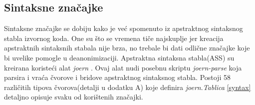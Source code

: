 \subsection{Sintaksne značajke}
Sintaksne značajke se dobiju kako je već spomenuto iz apstraktnog sintaksnog stabla izvornog koda. One su što se vremena tiče najskuplje jer kreacija apstraktnih sintaksnih stabala nije brza, no trebale bi dati odlične značajke koje bi uvelike pomogle u deanonimizaciji. Apstraktna sintaksna stabla(ASS) su kreirana koristeći alat \textit{joern} \cite{joern}. Ovaj alat nudi posebnu skriptu \textit{joern-parse} koja parsira i vraća čvorove i bridove apstraktnog sintaksnog stabla. Postoji 58 različitih tipova čvorova(detalji u dodatku A) koje definira \textit{joern}.\textit{Tablica} \ref{syntax} detaljno opisuje svaku od korištenih značajki.

